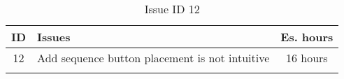 \begin{longtable} { | c | p{12cm} | c | } 
\hline
	ID 	&	Issues	&		 Es. hours \\\hline
	12 	&	Add sequence button placement is not intuitive	&	16 hours \\\hline
\caption{Issue ID 12}
\label{tab:spr3_addsequencenotintuitive}
\end{longtable}
